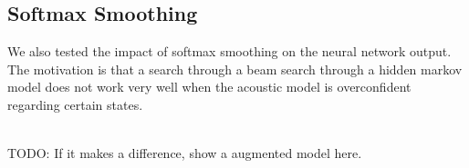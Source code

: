 \subsection{Softmax Smoothing}
We also tested the impact of softmax smoothing on the neural network output. The motivation is that a search through a beam search through a hidden markov model does not work very well when the acoustic model is overconfident regarding certain states. \\ \\
\begin{minipage}{\linewidth}
	\label{fig:softmax_fer}
	
	TODO: If it makes a difference, show a augmented model here. 
\end{minipage} \\ \\


\iffalse
\label{ch:approach}
This chapter describes our approach for acoustic modelling using TDNNs on a high level. 
We will also give a brief overview over unknown hyperparemters and design decisions,
as well as a coarse overview over the structure of our implementation. 

\chapter{Experiment Setup}
\label{ch:experiment_setup}
This chapter should describe the detailed preleminaries and hyperparemters of our training and evaluation setup:
\begin{itemize}
    \item which data, and which preprocessing was used
    \item how was the data reverbed
    \item which learning rate schedulers, optimizers, loss functions were used
    \item which mechanisms were used to make the training faster and scalable
\end{itemize}
\fi